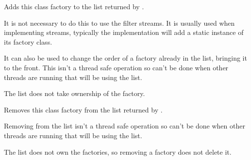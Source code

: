 
Adds this class factory to the list returned
by .

It is not necessary to do this to use the filter streams. It is usually
used when implementing streams, typically the implementation will 
add a static instance of its factory class.

It can also be used to change the order of a factory already in the list,
bringing it to the front. This isn't a thread safe operation
so can't be done when other threads are running that will be using the list.

The list does not take ownership of the factory.


\label{wxfilterclassfactoryremove}


Removes this class factory from the list returned
by .

Removing from the list isn't a thread safe operation
so can't be done when other threads are running that will be using the list.

The list does not own the factories, so removing a factory does not delete it.

